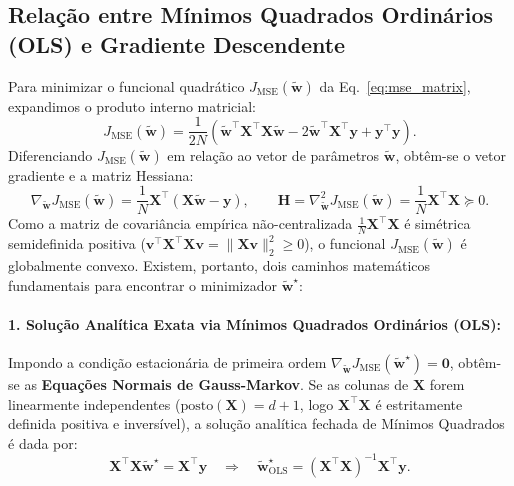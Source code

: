 ﻿\documentclass[runningheads]{llncs}
\begin{document}
\subsection{Rela\c{c}\~{a}o entre M\'{i}nimos Quadrados Ordin\'{a}rios (OLS) e Gradiente Descendente}
Para minimizar o funcional quadr\'{a}tico $J_{\text{MSE}}(\tilde{\mathbf{w}})$ da Eq.~\eqref{eq:mse_matrix}, expandimos o produto interno matricial:
\begin{equation}
    J_{\text{MSE}}(\tilde{\mathbf{w}}) = \frac{1}{2N}\left(\tilde{\mathbf{w}}^\top \mathbf{X}^\top \mathbf{X} \tilde{\mathbf{w}} - 2\tilde{\mathbf{w}}^\top \mathbf{X}^\top \mathbf{y} + \mathbf{y}^\top \mathbf{y}\right).
\end{equation}
Diferenciando $J_{\text{MSE}}(\tilde{\mathbf{w}})$ em rela\c{c}\~{a}o ao vetor de par\^{a}metros $\tilde{\mathbf{w}}$, obt\^{e}m-se o vetor gradiente e a matriz Hessiana:
\begin{equation}
    \nabla_{\tilde{\mathbf{w}}} J_{\text{MSE}}(\tilde{\mathbf{w}}) = \frac{1}{N}\mathbf{X}^\top (\mathbf{X}\tilde{\mathbf{w}} - \mathbf{y}), \qquad \mathbf{H} = \nabla_{\tilde{\mathbf{w}}}^2 J_{\text{MSE}}(\tilde{\mathbf{w}}) = \frac{1}{N}\mathbf{X}^\top \mathbf{X} \succeq 0.
    \label{eq:grad_hessian_ols}
\end{equation}
Como a matriz de covari\^{a}ncia emp\'{i}rica n\~{a}o-centralizada $\frac{1}{N}\mathbf{X}^\top \mathbf{X}$ \'{e} sim\'{e}trica semidefinida positiva ($\mathbf{v}^\top \mathbf{X}^\top \mathbf{X}\mathbf{v} = \|\mathbf{X}\mathbf{v}\|_2^2 \ge 0$), o funcional $J_{\text{MSE}}(\tilde{\mathbf{w}})$ \'{e} globalmente convexo. Existem, portanto, dois caminhos matem\'{a}ticos fundamentais para encontrar o minimizador $\tilde{\mathbf{w}}^\star$:

\paragraph{1. Solu\c{c}\~{a}o Anal\'{i}tica Exata via M\'{i}nimos Quadrados Ordin\'{a}rios (OLS):}
Impondo a condi\c{c}\~{a}o estacion\'{a}ria de primeira ordem $\nabla_{\tilde{\mathbf{w}}} J_{\text{MSE}}(\tilde{\mathbf{w}}^\star) = \mathbf{0}$, obt\^{e}m-se as \textbf{Equa\c{c}\~{o}es Normais de Gauss-Markov}. Se as colunas de $\mathbf{X}$ forem linearmente independentes ($\text{posto}(\mathbf{X}) = d + 1$, logo $\mathbf{X}^\top \mathbf{X}$ \'{e} estritamente definida positiva e invers\'{i}vel), a solu\c{c}\~{a}o anal\'{i}tica fechada de M\'{i}nimos Quadrados \'{e} dada por:
\begin{equation}
    \mathbf{X}^\top \mathbf{X} \tilde{\mathbf{w}}^\star = \mathbf{X}^\top \mathbf{y} \quad \Longrightarrow \quad \tilde{\mathbf{w}}^\star_{\text{OLS}} = (\mathbf{X}^\top \mathbf{X})^{-1} \mathbf{X}^\top \mathbf{y}.
    \label{eq:ols_normal}
\end{equation}
\end{document}
